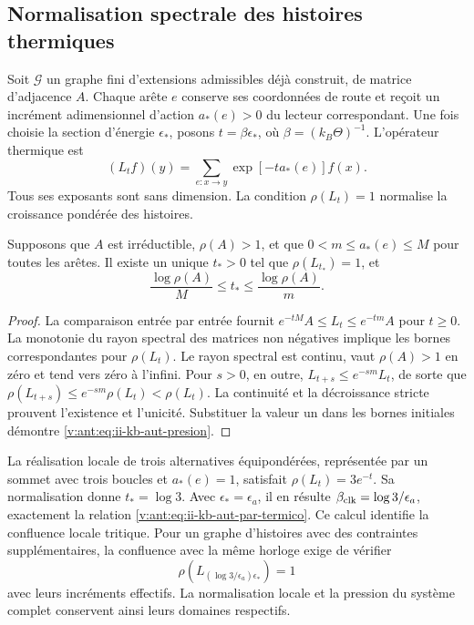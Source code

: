 \subsection{Normalisation spectrale des histoires thermiques}

Soit \(\mathcal G\) un graphe fini d'extensions admissibles déjà
construit, de matrice d'adjacence \(A\). Chaque arête \(e\) conserve
ses coordonnées de route et reçoit un incrément adimensionnel d'action
\(a_*(e)>0\) du lecteur correspondant. Une fois choisie la section d'énergie
\(\epsilon_*\), posons \(t=\beta\epsilon_*\), où
\(\beta=(k_B\Theta)^{-1}\). L'opérateur thermique est
\begin{equation}
 (L_tf)(y)=\sum_{e:x\to y}\exp[-t a_*(e)]f(x).
 \label{v:ant:eq:ii-kb-aut-operador}
\end{equation}
Tous ses exposants sont sans dimension. La condition
\(\rho(L_t)=1\) normalise la croissance pondérée des histoires.

\begin{proposition}
Supposons que \(A\) est irréductible, \(\rho(A)>1\), et que
\(0<m\leq a_*(e)\leq M\) pour toutes les arêtes. Il existe un unique
\(t_*>0\) tel que \(\rho(L_{t_*})=1\), et
\begin{equation}
 \frac{\log\rho(A)}{M}\leq t_*\leq
 \frac{\log\rho(A)}{m}.
 \label{v:ant:eq:ii-kb-aut-presion}
\end{equation}
\end{proposition}
\begin{proof}
La comparaison entrée par entrée fournit \(e^{-tM}A\leq L_t\leq e^{-tm}A\) pour \(t\geq0\). La monotonie du rayon spectral des matrices non négatives implique les bornes correspondantes pour \(\rho(L_t)\). Le rayon spectral est continu, vaut \(\rho(A)>1\) en zéro et tend vers zéro à l'infini. Pour \(s>0\), en outre, \(L_{t+s}\leq e^{-sm}L_t\), de sorte que \(\rho(L_{t+s})\leq e^{-sm}\rho(L_t)<\rho(L_t)\). La continuité et la décroissance stricte prouvent l'existence et l'unicité. Substituer la valeur un dans les bornes initiales démontre \eqref{v:ant:eq:ii-kb-aut-presion}.
\end{proof}

La réalisation locale de trois alternatives équipondérées, représentée
par un sommet avec trois boucles et \(a_*(e)=1\), satisfait
\(\rho(L_t)=3e^{-t}\). Sa normalisation donne \(t_*=\log3\).
Avec \(\epsilon_*=\epsilon_a\), il en résulte
\(\beta_{\rm clk}=\log3/\epsilon_a\), exactement la relation
\eqref{v:ant:eq:ii-kb-aut-par-termico}. Ce calcul identifie la
confluence locale tritique. Pour un graphe d'histoires avec des contraintes
supplémentaires, la confluence avec la même horloge exige de vérifier
\[
 \rho\!\left(L_{(\log3/\epsilon_a)\epsilon_*}\right)=1
\]
avec leurs incréments effectifs. La normalisation locale et la pression
du système complet conservent ainsi leurs domaines respectifs.

